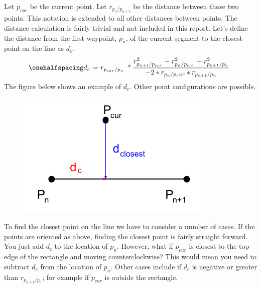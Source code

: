 \documentclass[12pt]{article}
\begin{document}
Let \textit{$p_{cur}$} be the current point. Let \textit{$r_{p_n/p_{n+1}}$} be the distance between those two points. This notation is extended to all other distances between points. The distance calculation is fairly trivial and not included in this report. Let's define the distance from the first waypoint, \textit{$p_n$}, of the current segment to the closest point on the line as \textit{$d_c$}. 
\begin{equation}
\onehalfspacing
\centering
\emph{$d_c$ = $r_{p_{cur}/p_n}$ * $\frac{r_{p_{n+1}/p_{cur}}^2 -  r_{p_n/p_{cur}}^2 - r_{p_{n+1}/p_n}^2}{-2*r_{p_n/p_cur}*r_{p_{n+1}/p_n}}$ }
\end{equation}
The figure below shows an example of \textit{$d_c$}. Other point configurations are possible. 
\begin{figure}[ht]
\hspace{0.5cm}
\centering
\includegraphics[scale=0.5]{Pictures/points_1.png}
\end{figure}
To find the closest point on the line we have to consider a number of cases. If the points are oriented as above, finding the closest point is fairly straight forward. You just add  \textit{$d_c$} to the location of \textit{$p_n$}. However, what if  \textit{$p_{cur}$} is closest to the top edge of the rectangle and moving counterclockwise? This would mean you need to subtract  \textit{$d_c$} from the location of \textit{$p_n$}. Other cases include if \textit{$d_c$} is negative or greater than \textit{$r_{p_{n+1}/p_n}$}; for example if \textit{$p_{cur}$} is outside the rectangle.

 
\end{document}
